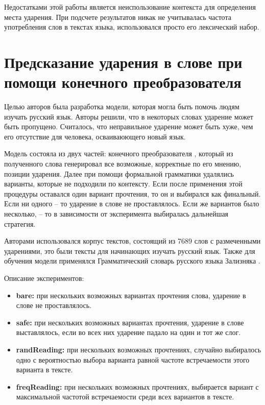 \documentclass[14pt, a4paper, russian]{extreport}
\begin{document}
Недостатками этой работы является неиспользование контекста для определения места ударения. При подсчете результатов никак не учитывалась частота употребления слов в текстах языка, использовался просто его лексический набор.

\section{Предсказание ударения в слове при помощи конечного преобразователя}

Целью авторов\cite{reynolds} была разработка модели, которая могла быть помочь людям изучать русский язык. Авторы решили, что в некоторых словах ударение может быть пропущено. Считалось, что неправильное ударение может быть хуже, чем его отсутствие для человека, осваиваюющего новый язык.

Модель состояла из двух частей: конечного преобразователя \cite{koskenniemi, karttunen}, который из полученного слова генерировал все возможные, корректные по его мнению, позиции ударения. Далее при помощи формальной грамматики \cite{karlsson} удалялись варианты, которые не подходили по контексту. Если после применения этой процедуры оставался один вариант прочтения, то он и выбирался как финальный. Если ни одного -- то ударение в слове не проставлялось. Если же вариантов было несколько, -- то в зависимости от эксперимента выбиралась дальнейшая стратегия. 

Авторами использовался корпус текстов, состоящий из 7689 слов с размеченными ударениями, это были тексты для начинающих изучать русский язык. Также для обучения модели применялся Грамматический словарь русского языка Зализняка \cite{zaliz}. 

Описание экспериментов:
\begin{itemize}
	\item \textbf{bare:} при нескольких возможных вариантах прочтения  слова, ударение в слове не проставлялось.
	\item \textbf{safe:}  при нескольких возможных вариантах прочтения, ударение в слове выставлялось, если во всех них ударение падало на один и тот же слог.
	\item \textbf{randReading:} при нескольких возможных прочтениях, случайно выбиралось одно с вероятностью выбора варианта равной частоте встречаемости этого варианта в тексте.
	
	\item \textbf{freqReading:} при нескольких возможных прочтениях, выбирается вариант с максимальной  частотой встречаемости среди всех  вариантов в тексте.
\end{itemize}
\end{document}
